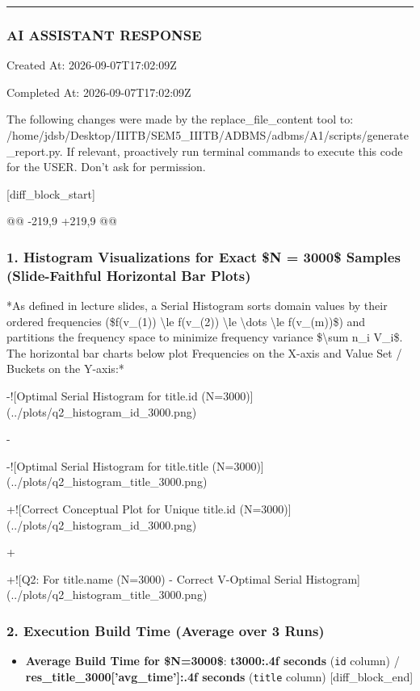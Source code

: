 \documentclass[11pt,a4paper]{article}
\begin{document}
\hrule

\subsubsection{AI ASSISTANT RESPONSE}

Created At: 2026-09-07T17:02:09Z

Completed At: 2026-09-07T17:02:09Z

The following changes were made by the replace\_file\_content tool to: /home/jdsb/Desktop/IIITB/SEM5\_IIITB/ADBMS/adbms/A1/scripts/generate\_report.py. If relevant, proactively run terminal commands to execute this code for the USER. Don't ask for permission.

[diff\_block\_start]

@@ -219,9 +219,9 @@

\subsubsection{1. Histogram Visualizations for Exact \$N = 3000\$ Samples (Slide-Faithful Horizontal Bar Plots)}
*As defined in lecture slides, a Serial Histogram sorts domain values by their ordered frequencies (\$f(v\_{{(1)}}) \textbackslash{}le f(v\_{{(2)}}) \textbackslash{}le \textbackslash{}dots \textbackslash{}le f(v\_{{(m)}})\$) and partitions the frequency space to minimize frequency variance \$\textbackslash{}sum n\_i V\_i\$. The horizontal bar charts below plot Frequencies on the X-axis and Value Set / Buckets on the Y-axis:*


-![Optimal Serial Histogram for title.id (N=3000)](../plots/q2\_histogram\_id\_3000.png)

-

-![Optimal Serial Histogram for title.title (N=3000)](../plots/q2\_histogram\_title\_3000.png)

+![Correct Conceptual Plot for Unique title.id (N=3000)](../plots/q2\_histogram\_id\_3000.png)

+

+![Q2: For title.name (N=3000) - Correct V-Optimal Serial Histogram](../plots/q2\_histogram\_title\_3000.png)


\subsubsection{2. Execution Build Time (Average over 3 Runs)}
\begin{itemize}
\item \textbf{Average Build Time for \$N=3000\$}: \textbf{{t3000:.4f} seconds} (\texttt{id} column) / \textbf{{res\_title\_3000['avg\_time']:.4f} seconds} (\texttt{title} column)
[diff\_block\_end]

\end{itemize}
\end{document}
